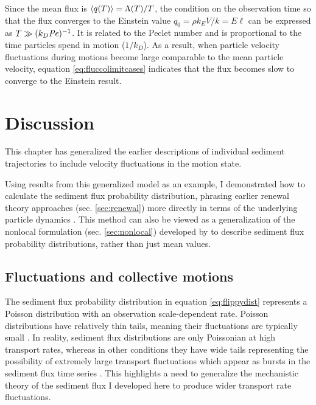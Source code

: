 Since the mean flux is $\langle q(T) \rangle = \Lambda(T)/T$, the condition on the observation time so that the flux converges to the Einstein value $q_0 = \rho k_E V/k = E \ell$ can be expressed as $T\gg (k_D \mbox{\textit{Pe}})^{-1}$. It is related to the Peclet number and is proportional to the time particles spend in motion ($1/k_D$). As a result, when particle velocity fluctuations during motions become large comparable to the mean particle velocity, equation \ref{eq:fluccolimitcases} indicates that the flux becomes slow to converge to the Einstein result.

\section{Discussion \label{sec:disc}}

This chapter has generalized the earlier descriptions of individual sediment trajectories \citep[e.g.][]{Lisle1998,Lajeunesse2017} to include velocity fluctuations in the motion state.

Using results from this generalized model as an example, I demonstrated how to calculate the sediment flux probability distribution, phrasing earlier renewal theory approaches (sec. \ref{sec:renewal}) more directly in terms of the underlying particle dynamics \citep[e.g.][]{Turowski2010,Ancey2020}.
This method can also be viewed as a generalization of the nonlocal formulation (sec. \ref{sec:nonlocal}) developed by \citet{Parker2000,Furbish2012a} to describe sediment flux probability distributions, rather than just mean values.

\subsection{Fluctuations and collective motions}

The sediment flux probability distribution in equation \ref{eq:flippydist} represents a Poisson distribution with an observation scale-dependent rate.
Poisson distributions have relatively thin tails, meaning their fluctuations are typically small \citep{Ancey2006}.
In reality, sediment flux distributions are only Poissonian at high transport rates, whereas in other conditions they have wide tails representing the possibility of extremely large transport fluctuations \citep{Ancey2008,Turowski2010,Dhont2018,Saletti2015} which appear as bursts \citep[e.g.][]{Goh2008} in the sediment flux time series \citep{Singh2009, Heyman2013,Benavides2021}. 
This highlights a need to generalize the mechanistic theory of the sediment flux I developed here to produce wider transport rate fluctuations.

